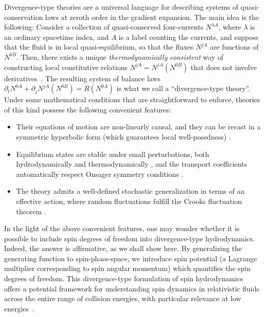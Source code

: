 \documentclass[12pt,aps,prd,nofootinbib,noshowkeys,noshowpacs,longbibliography,
superscriptaddress,tightenlines,floatfix,preprintnumbers]{revtex4-2}
\begin{document}
Divergence-type theories \cite{Liu1986,GerochLindblom1990} are a universal language for describing systems of quasi-conservation laws \cite{Peralta-Ramos:2009srp,Peralta-Ramos:2010qdp,GavassinoNonHydro2022,Baggioli:2023tlc} at zeroth order in the gradient expansion. The main idea is the following: Consider a collection of quasi-conserved four-currents $N^{\lambda A}$, where $\lambda$ is an ordinary spacetime index, and $A$ is a label counting the currents, and suppose that the fluid is in local quasi-equilibrium, so that the fluxes $N^{jA}$ are functions of $N^{0B}$. Then, there exists a unique \emph{thermodynamically consistent} way of constructing local constitutive relations $N^{jA}=N^{jA}(N^{0B})$ that does not involve derivatives~\cite{GerochLindblom1990}. The resulting system of balance laws $\partial_t N^{0A}+\partial_j N^{jA}(N^{0B})=R(N^{0A})$ is what we call a ``divergence-type theory''. Under some mathematical conditions that are straightforward to enforce, theories of this kind possess the following convenient features:
\begin{itemize}
\item Their equations of motion are non-linearly causal, and they can be recast in a symmetric hyperbolic form (which guarantees local well-posedness) \cite{GerochLindblom1990,Geroch_Lindblom_1991_causal}.
\item Equilibrium states are stable under small perturbations, both hydrodynamically and thermodynamically \cite{GavassinoGibbs2021,GavassinoCausality2021}, and the transport coefficients automatically respect Onsager symmetry conditions \cite{GavassinoCasmir2022}.
\item The theory admits a well-defined stochastic generalization in terms of an effective action, where random fluctuations fulfill the Crooks fluctuation theorem \cite{Mullins:2025vqa}.
\end{itemize}
In the light of the above convenient features, one may wonder whether it is possible to include spin degrees of freedom into divergence-type hydrodynamics. Indeed, the answer is affirmative, as we shall show here. By generalizing the generating function to spin-phase-space, we introduce spin potential (a Lagrange multiplier corresponding to spin angular momentum) which quantifies the spin degrees of freedom.
This divergence-type formulation of spin hydrodynamics offers a potential framework for understanding spin dynamics in relativistic fluids across the entire range of collision energies, with particular relevance at low energies~\cite{STAR:2021beb,STAR:2023nvo,STAR:2023eck}.
\end{document}
